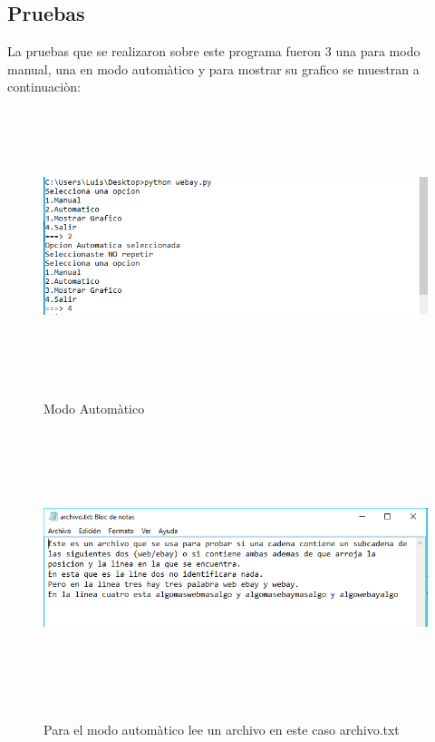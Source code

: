 \documentclass[12pt]{article}
\begin{document}
\newpage
\subsection{Pruebas}
La pruebas que se realizaron sobre este programa fueron 3 una para modo manual, una en modo automàtico y para mostrar su grafico se muestran a continuaciòn: \\

\begin{figure}[H]
\begin{center}
\includegraphics[width=\textwidth, height=8cm]{auto_webay}
\label{fig:auto_webay}
\caption{Modo Automàtico}
\end{center}
\end{figure}

\begin{figure}[H]
\begin{center}
\includegraphics[width=\textwidth, height=8cm]{auto_webay_archivo}
\label{auto_webay_archivo}
\caption{Para el modo automàtico lee un archivo en este caso archivo.txt}
\end{center}
\end{figure}
\end{document}
